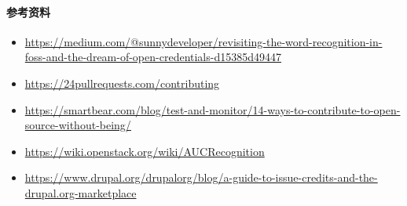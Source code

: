 \hypertarget{ux53c2ux8003ux8d44ux6599}{%
\paragraph{参考资料}\label{ux53c2ux8003ux8d44ux6599}}

\begin{itemize}
\tightlist
\item
  \href{https://medium.com/@sunnydeveloper/revisiting-the-word-recognition-in-foss-and-the-dream-of-open-credentials-d15385d49447}{https://medium.com/@sunnydeveloper/revisiting-the-word-recognition-in-foss-and-the-dream-of-open-credentials-d15385d49447}
\item
  \href{https://24pullrequests.com/contributing}{https://24pullrequests.com/contributing}
\item
  \href{https://smartbear.com/blog/test-and-monitor/14-ways-to-contribute-to-open-source-without-being/}{https://smartbear.com/blog/test-and-monitor/14-ways-to-contribute-to-open-source-without-being/}
\item
  \href{https://wiki.openstack.org/wiki/AUCRecognition}{https://wiki.openstack.org/wiki/AUCRecognition}
\item
  \href{https://www.drupal.org/drupalorg/blog/a-guide-to-issue-credits-and-the-drupal.org-marketplace}{https://www.drupal.org/drupalorg/blog/a-guide-to-issue-credits-and-the-drupal.org-marketplace}
\end{itemize}
